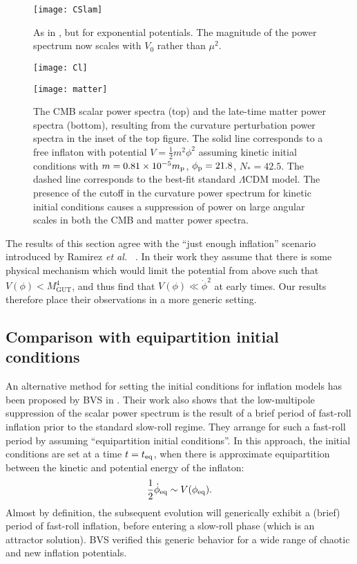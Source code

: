 %
\begin{figure}
  \texttt{[image: CSlam]}
  \caption{As in \protect{}, but for exponential
  potentials. The magnitude of the power spectrum now scales with
  $V_0$ rather than $\mu^2$.  }
  \label{fig:figure_CSlam}
\end{figure}
%

%
\begin{figure}
  \centerline{\texttt{[image: Cl]}}
  \centerline{\texttt{[image: matter]}}
  \caption{The CMB scalar power spectra (top) and the late-time matter
    power spectra (bottom), resulting from the curvature perturbation
    power spectra in the inset of the top figure. The solid line
    corresponds to a free inflaton with potential
    $V=\frac{1}{2}m^2\phi^2$ assuming kinetic initial conditions with
    $m=0.81\times10^{-5}m_{\mathrm{p}}$, $\phi_{\mathrm{p}} = 21.8$, $N_*=42.5$. The dashed
    line corresponds to the best-fit standard $\Lambda$CDM model.  The
    presence of the cutoff in the curvature power spectrum for
    kinetic initial conditions causes a suppression of power on large
    angular scales in both the CMB and matter power spectra.  }
	\label{fig:figure_Cl}
\end{figure}
%
The results of this section agree with the ``just enough inflation''
scenario introduced by Ramirez {\it et al.\ }
\citep{Ramirez_excluded_2009,Ramirez_predictions_2012,Ramirez_low_2012}.
In their work they assume that there is some physical mechanism which
would limit the potential from above such that
$V(\phi)<M_\mathrm{GUT}^4$, and thus find that
$V(\phi)\ll\dot{\phi}^2$ at early times. Our results therefore place
their observations in a more generic setting.


\subsection{Comparison with equipartition initial conditions}
\label{sec:comparison}

An alternative method for setting the initial conditions for inflation
models has been proposed by BVS in
\citep{boyanovsky_cmb_2006}. Their work also shows that the
low-multipole suppression of the scalar power spectrum is the result
of a brief period of fast-roll inflation prior to the standard
slow-roll regime. They arrange for such a fast-roll period by assuming
``equipartition initial conditions''. In this approach, the initial
conditions are set at a time $t=t_{\mathrm{eq}}$, when there is approximate
equipartition between the kinetic and potential energy of the
inflaton:
%
\begin{equation}
  \frac{1}{2}\dot{\phi}_{\mathrm{eq}} \sim V(\phi_{\mathrm{eq}}).
  \label{eqn:bvsbc}
\end{equation}
%
Almost by definition, the subsequent evolution will generically
exhibit a (brief) period of fast-roll inflation, before entering a
slow-roll phase (which is an attractor solution). BVS verified this
generic behavior for a wide range of chaotic and new inflation
potentials.

